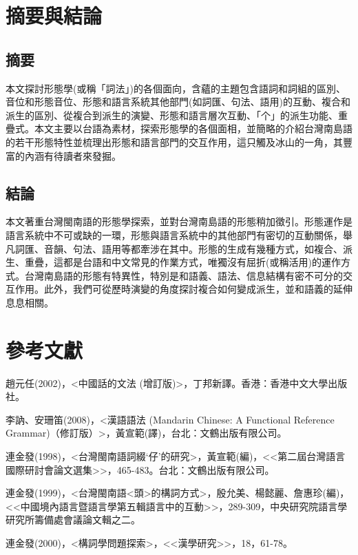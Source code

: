 \section{\rmfamily 摘要與結論}
\subsection{\rmfamily 摘要}

\textrm{本文探討形態學(或稱「詞法」)的各個面向，含蘊的主題包含語詞和詞組的區別、音位和形態音位、形態和語言系統其他部門(如詞匯、句法、語用)的互動、複合和派生的區別、從複合到派生的演變、形態和語言層次互動、「个」的派生功能、重疊式。本文主要以台語為素材，探索形態學的各個面相，並簡略的介紹台灣南島語的若干形態特性並梳理出形態和語言部門的交互作用，這只觸及冰山的一角，其豐富的內涵有待讀者來發掘。}

\subsection{\rmfamily 結論}

\textrm{本文著重台灣閩南語的形態學探索，並對台灣南島語的形態稍加徵引。形態運作是語言系統中不可或缺的一環，形態與語言系統中的其他部門有密切的互動關係，舉凡詞匯、音韻、句法、語用等都牽涉在其中。形態的生成有幾種方式，如複合、派生、重疊，這都是台語和中文常見的作業方式，唯獨沒有屈折(或稱活用)的運作方式。台灣南島語的形態有特異性，特別是和語義、語法、信息結構有密不可分的交互作用。此外，我們可從歷時演變的角度探討複合如何變成派生，並和語義的延伸息息相關。}

\section{\rmfamily 參考文獻}

\textrm{趙元任(2002)，<中國話的文法 (增訂版)>，丁邦新譯。香港：香港中文大學出版社。}

\textrm{李訥、安珊笛(2008)，<漢語語法 (Mandarin Chinese: A Functional Reference Grammar)（修訂版）>，黃宣範(譯)，台北：文鶴出版有限公司。}

\textrm{連金發(1998)，<台灣閩南語詞綴‘仔’的研究>，黃宣範(編)，<<第二屆台灣語言國際研討會論文選集>}\textrm{>}\textrm{，465-483。台北：文鶴出版有限公司。}

\textrm{連金發(1999)，<台灣閩南語<頭>的構詞方式>，殷允美、楊懿麗、詹惠珍(編)，<<中國境內語言暨語言學{\textbullet}第五輯{\textbullet}語言中的互動>>，289-309，中央研究院語言學研究所籌備處會議論文輯之二。}

\rmfamily
連金發(2000)，<構詞學問題探索>，<<漢學研究>>，18，61-78。

